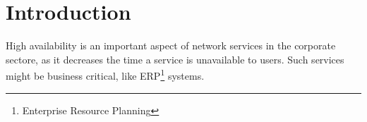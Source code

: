 \section{Introduction}

High availability is an important aspect of network services in the corporate
sectore, as it decreases the time a service is unavailable to users.
Such services might be business critical, like ERP\footnote{Enterprise Resource Planning} systems.